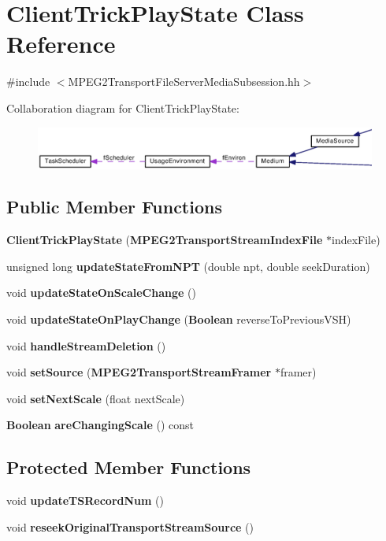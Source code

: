 \section{Client\+Trick\+Play\+State Class Reference}
\label{classClientTrickPlayState}


{\ttfamily \#include $<$M\+P\+E\+G2\+Transport\+File\+Server\+Media\+Subsession.\+hh$>$}



Collaboration diagram for Client\+Trick\+Play\+State\+:
\nopagebreak
\begin{figure}[H]
\begin{center}
\leavevmode
\includegraphics[width=350pt]{classClientTrickPlayState__coll__graph}
\end{center}
\end{figure}
\subsection*{Public Member Functions}
\begin{DoxyCompactItemize}
\item 
{\bf Client\+Trick\+Play\+State} ({\bf M\+P\+E\+G2\+Transport\+Stream\+Index\+File} $\ast$index\+File)
\item 
unsigned long {\bf update\+State\+From\+N\+P\+T} (double npt, double seek\+Duration)
\item 
void {\bf update\+State\+On\+Scale\+Change} ()
\item 
void {\bf update\+State\+On\+Play\+Change} ({\bf Boolean} reverse\+To\+Previous\+V\+S\+H)
\item 
void {\bf handle\+Stream\+Deletion} ()
\item 
void {\bf set\+Source} ({\bf M\+P\+E\+G2\+Transport\+Stream\+Framer} $\ast$framer)
\item 
void {\bf set\+Next\+Scale} (float next\+Scale)
\item 
{\bf Boolean} {\bf are\+Changing\+Scale} () const 
\end{DoxyCompactItemize}
\subsection*{Protected Member Functions}
\begin{DoxyCompactItemize}
\item 
void {\bf update\+T\+S\+Record\+Num} ()
\item 
void {\bf reseek\+Original\+Transport\+Stream\+Source} ()
\end{DoxyCompactItemize}

